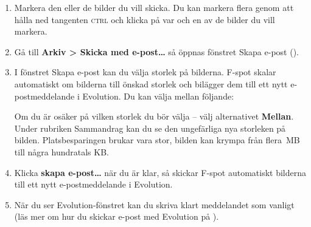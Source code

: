 \documentclass[a4paper,final]{memoir} %
\begin{document}
\begin{enumerate}

\item Markera den eller de bilder du vill skicka. Du kan markera flera genom att hålla ned tangenten \textsc{ctrl} och klicka på var och en av de bilder du vill markera.

\item Gå till \textbf{Arkiv \textgreater{} Skicka med e-post\ldots{}} så öppnas fönstret Skapa e-post ().


\item I fönstret Skapa e-post kan du välja storlek på bilderna. F-spot skalar automatiskt om bilderna till önskad storlek och bilägger dem till ett nytt e-postmeddelande i Evolution. Du kan välja mellan följande:

\begin{itemize}


\end{itemize}

Om du är osäker på vilken storlek du bör välja -- välj alternativet \textbf{Mellan}. Under rubriken Sammandrag kan du se den ungefärliga nya storleken på bilden. Platsbesparingen brukar vara stor, bilden kan krympa från flera~MB till några hundratals KB. 

\item Klicka \textbf{skapa e-post\ldots{}} när du är klar, så skickar F-spot automatiskt bilderna till ett nytt e-postmeddelande i Evolution. 

\item När du ser Evolution-fönstret kan du skriva klart meddelandet som vanligt (läs mer om hur du skickar e-post med Evolution på ).

\end{enumerate}
\end{document}

